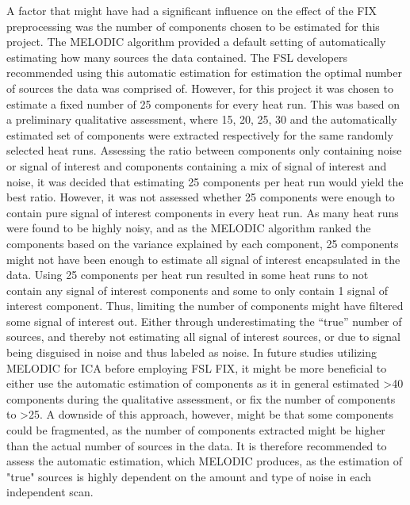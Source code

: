 A factor that might have had a significant influence on the effect of the FIX preprocessing was the number of components chosen to be estimated for this project. The MELODIC algorithm provided a default setting of automatically estimating how many sources the data contained. The FSL developers recommended using this automatic estimation for estimation the optimal number of sources the data was comprised of. However, for this project it was chosen to estimate a fixed number of 25 components for every heat run. This was based on a preliminary qualitative assessment, where 15, 20, 25, 30 and the automatically estimated set of components were extracted respectively for the same randomly selected heat runs. Assessing the ratio between components only containing noise or signal of interest and components containing a mix of signal of interest and noise, it was decided that estimating 25 components per heat run would yield the best ratio. However, it was not assessed whether 25 components were enough to contain pure signal of interest components in every heat run. As many heat runs were found to be highly noisy, and as the MELODIC algorithm ranked the components based on the variance explained by each component, 25 components might not have been enough to estimate all signal of interest encapsulated in the data. Using 25 components per heat run resulted in some heat runs to not contain any signal of interest components and some to only contain 1 signal of interest component. Thus, limiting the number of components might have filtered some signal of interest out. Either through underestimating the “true” number of sources, and thereby not estimating all signal of interest sources, or due to signal being disguised in noise and thus labeled as noise. In future studies utilizing MELODIC for ICA before employing FSL FIX, it might be more beneficial to either use the automatic estimation of components as it in general estimated >40 components during the qualitative assessment, or fix the number of components to >25. A downside of this approach, however, might be that some components could be fragmented, as the number of components extracted might be higher than the actual number of sources in the data. It is therefore recommended to assess the automatic estimation, which MELODIC produces, as the estimation of "true" sources is highly dependent on the amount and type of noise in each independent scan. \\

